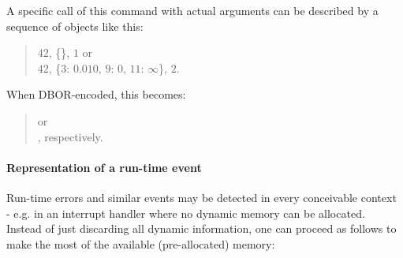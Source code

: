 \medskip
\begin{BeginParPenalty}
    A specific call of this command with actual arguments can be described by a sequence of objects like this:
    \begin{quote}
        $42$, \{\}, $1$ or \\
        $42$, \{$3$: $0.010$, $9$: $0$, $11$: $\infty$\}, $2$.
    \end{quote}
\end{BeginParPenalty}

\begin{BeginParPenalty}
    When DBOR-encoded, this becomes:
    \begin{quote}
        or \\
        \ByteSequence{
            \DborFirstByteHex{Number}{0C},
            \DborFirstByteHex{Dictionary}{A7}, %
                \DborFirstByteHex{Number}{03},
                \DborFirstByteHex{Number}{E9}, \DborNextByteHex{01},
                \DborFirstByteHex{Number}{09},
                \DborFirstByteHex{Number}{00},
                \DborFirstByteHex{Number}{0B},
                \DborFirstByteHex{Numberlike}{FE},
            \DborFirstByteHex{Number}{02}
        }, respectively.
    \end{quote}
\end{BeginParPenalty}

\paragraph{Representation of a run-time event}

Run-time errors and similar events may be detected in every conceivable context -
e.g. in an interrupt handler where no dynamic memory can be allocated.
Instead of just discarding all dynamic information, one can proceed as follows to make the most of the available
(pre-allocated) memory:

